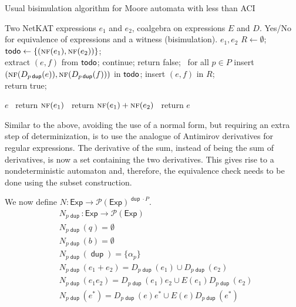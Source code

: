 \documentclass{article}
\newcommand\pdup{\mathop{\mathsf{dup}}}
\newcommand\Exp{\mathsf{Exp}}
\begin{document}
\begin{algorithm}
  \caption{Usual bisimulation algorithm for Moore automata with less than ACI
    \label{alg:Moore_naive_2}}
  \begin{algorithmic}[1]
  \Require Two NetKAT expressions $e_1$ and $e_2$, coalgebra on expressions $E$ and $D$.
  \Ensure Yes/No for equivalence of expressions and a witness (bisimulation).
 {$e_1,e_2$}
\State $R \gets \emptyset$; $\textsf{todo} \gets \{(\text{\sc nf}({e_1}),\text{\sc nf}({e_2}))\}$;\\
     \State extract $(e,f)$ from $\textsf{todo}$;
       continue; 
      \Else {} return false; 
      \Else\ for all { $p\in P$} 
       \State  insert $(\text{\sc nf}(D_{p\pdup}(e)),\text{\sc nf}(D_{p\pdup}(f)))$ in $\textsf{todo}$;
       \EndIf
       \EndIf
\State insert $(e,f)$ in $R$; \\
return true;
\EndFunction

 {$e$}
	\ return $\text{\sc nf}(e_1)$ \Else\ return $\text{\sc nf}(e_1) + \text{\sc nf}(e_2)$
	  \EndIf
\Else\ return $e$
  \EndIf
\EndFunction

\end{algorithmic}
\end{algorithm}

Similar to the above, avoiding the use of a normal form, but requiring an extra step of determinization, is to use the analogue of Antimirov derivatives for regular expressions. The derivative of the sum, instead of being the sum of derivatives, is now a set containing the two derivatives. This gives rise to a nondeterministic automaton and, therefore, the equivalence check needs to be done using the subset construction. 

We now define $N \colon \Exp \to \mathcal P(\Exp)^{\pdup \cdot P}$.
\begin{align*}
& N_{p\pdup} \colon \Exp \to \mathcal P(\Exp)  \\
& N_{p\pdup} (q) = \emptyset \\
& N_{p\pdup} (b) = \emptyset \\
& N_{p\pdup} (\pdup) =  \{\alpha_p\}\\
& N_{p\pdup} (e_1+e_2) =  D_{p\pdup}  (e_1) \cup  D_{p\pdup}  (e_2) \\
& N_{p\pdup} (e_1e_2) = D_{p\pdup} (e_1)e_2 \cup E(e_1)D_{p\pdup} (e_2) \\
& N_{p\pdup} (e^*) = D_{p\pdup} (e)e^* \cup E(e)D_{p\pdup} (e^*) \\
 \end{align*}
\end{document}
